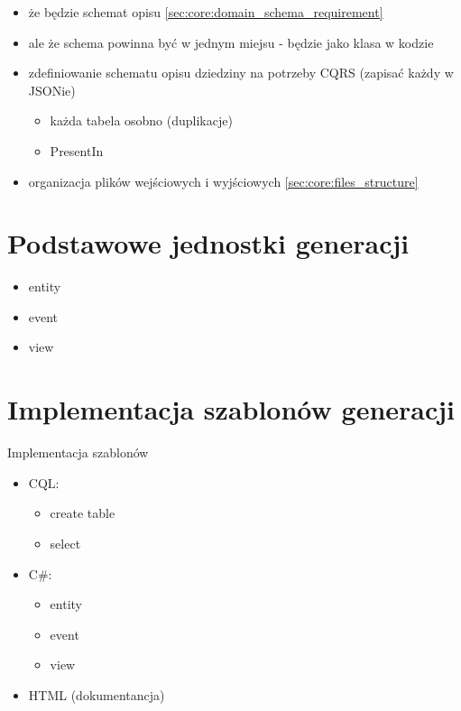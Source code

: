 \begin{itemize}
 \item że będzie schemat opisu \ref{sec:core:domain_schema_requirement}
 \item ale że schema powinna być w jednym miejsu - będzie jako klasa w kodzie
 \item zdefiniowanie schematu opisu dziedziny na potrzeby CQRS (zapisać każdy w JSONie)
  \begin{itemize}
   \item każda tabela osobno (duplikacje)
   \item PresentIn
  \end{itemize}
 \item organizacja plików wejściowych i wyjściowych \ref{sec:core:files_structure}
\end{itemize}



\section{Podstawowe jednostki generacji}

\begin{itemize}
 \item entity
 \item event
 \item view
\end{itemize}



\section{Implementacja szablonów generacji}

Implementacja szablonów

\begin{itemize}
 \item CQL:
  \begin{itemize}
   \item create table
   \item select
  \end{itemize}
 \item C\#:
  \begin{itemize}
   \item entity
   \item event
   \item view
  \end{itemize}
 \item HTML (dokumentancja)
\end{itemize}



